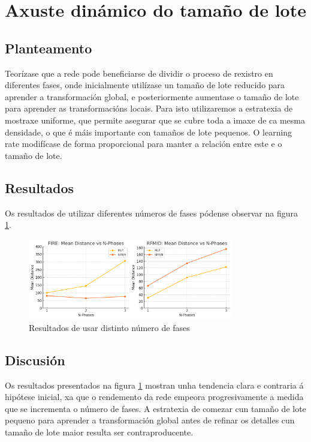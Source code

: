 \section{Axuste dinámico do tamaño de lote}
\label{sec:Dynamic tamaño de lote}

\subsection{Planteamento}
\label{subsec:Planteamento-phases}

Teorízase que a rede pode beneficiarse de dividir o proceso de rexistro en diferentes fases, onde inicialmente utilízase un tamaño de lote reducido para aprender a transformación global, e posteriormente aumentase o tamaño de lote para aprender as transformacións locais.
Para isto utilizaremos a estratexia de mostraxe uniforme, que permite asegurar que se cubre toda a imaxe de ca mesma densidade, o que é máis importante con tamaños de lote pequenos. O learning rate modifícase de forma proporcional para manter a relación entre este e o tamaño de lote.

\subsection{Resultados}
\label{subsec:Resultados-phases}

Os resultados de utilizar diferentes números de fases pódense observar na figura \ref{fig:nphases}.
\begin{figure}[tbp]
    \centering
    \includegraphics[width=0.8\textwidth]{imaxes/lottery/nphases.png}
    \caption{Resultados de usar distinto número de fases}
    \label{fig:nphases}
\end{figure}


\subsection{Discusión}
\label{subsec:Discusion-phases}

Os resultados presentados na figura \ref{fig:nphases} mostran unha tendencia clara e contraria á hipótese inicial, xa que o rendemento da rede empeora progresivamente a medida que se incrementa o número de fases. A estratexia de comezar cun tamaño de lote pequeno para aprender a transformación global antes de refinar os detalles cun tamaño de lote maior resulta ser contraproducente.

